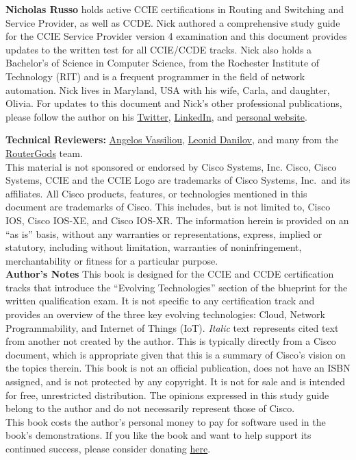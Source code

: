 \noindent
\textbf{Nicholas Russo} holds active CCIE certifications in Routing and
Switching and Service Provider, as well as CCDE\@. Nick authored a comprehensive
study guide for the CCIE Service Provider version 4 examination and this
document provides updates to the written test for all CCIE/CCDE tracks. Nick
also holds a Bachelor’s of Science in Computer Science, from the Rochester
Institute of Technology (RIT) and is a frequent programmer in the field of
network automation. Nick lives in Maryland, USA with his wife, Carla, and
daughter, Olivia. For updates to this document and Nick’s other professional
publications, please follow the author on his
\href{https://twitter.com/nickrusso42518}{Twitter},
\href{https://www.linkedin.com/in/njrusmc}{LinkedIn}, and
\href{http://njrusmc.net}{personal website}. \\


\textbf{Technical Reviewers:}
\href{https://twitter.com/ipmess}{Angelos Vassiliou},
\href{https://twitter.com/iosxrqna}{Leonid Danilov}, and many from the
\href{https://www.meetup.com/routergods}{RouterGods} team. \\

This material is not sponsored or endorsed by Cisco Systems, Inc. Cisco, Cisco
Systems, CCIE and the CCIE Logo are trademarks of Cisco Systems, Inc.\ and its
affiliates. All Cisco products, features, or technologies mentioned in this
document are trademarks of Cisco. This includes, but is not limited to, Cisco
IOS, Cisco IOS-XE, and Cisco IOS-XR\@. The information herein is provided on an
``as is'' basis, without any warranties or representations, express, implied or
statutory, including without limitation, warranties of noninfringement,
merchantability or fitness for a particular purpose. \\

\textbf{Author’s Notes}
This book is designed for the CCIE and CCDE certification tracks that
introduce the ``Evolving Technologies'' section of the blueprint for the written
qualification exam. It is not specific to any certification track and provides
an overview of the three key evolving technologies: Cloud, Network
Programmability, and Internet of Things (IoT). \textit{Italic} text represents
cited text from another not created by the author. This is typically directly
from a Cisco document, which is appropriate given that this is a summary of
Cisco’s vision on the topics therein. This book is not an official
publication, does not have an ISBN assigned, and is not protected by any
copyright. It is not for sale and is intended for free, unrestricted
distribution. The opinions expressed in this study guide belong to the author
and do not necessarily represent those of Cisco. \\

This book costs the author's personal money to pay for software used in the
book's demonstrations. If you like the book and want to help support its
continued success, please consider donating
\href{https://www.paypal.com/cgi-bin/webscr?cmd=_donations&business=KA9QZVDMVYN26&lc=US&item_name=Evolving\%20Technology\%20Study\%20Guide&item_number=42518&currency_code=USD&bn=PP\%2dDonationsBF\%3abtn_donate_LG\%2egif\%3aNonHosted}{here}.
